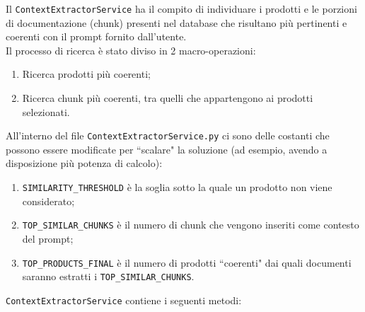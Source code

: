Il \texttt{ContextExtractorService} ha il compito di individuare i prodotti e le porzioni di documentazione (chunk) presenti nel database che risultano più pertinenti e coerenti con il prompt fornito dall'utente.\\ Il processo di ricerca \`e stato diviso in 2 macro-operazioni:
\begin{enumerate}
    \item Ricerca prodotti pi\`u coerenti;
    \item Ricerca chunk pi\`u coerenti, tra quelli che appartengono ai prodotti selezionati.
\end{enumerate}
All'interno del file \texttt{ContextExtractorService.py} ci sono delle costanti che possono essere modificate per ``scalare" la soluzione (ad esempio, avendo a disposizione pi\`u potenza di calcolo):
\begin{enumerate}
    \item \texttt{SIMILARITY\_THRESHOLD} \`e la soglia sotto la quale un prodotto non viene considerato;
    \item \texttt{TOP\_SIMILAR\_CHUNKS} \`e il numero di chunk che vengono inseriti come contesto del prompt;
    \item \texttt{TOP\_PRODUCTS\_FINAL} \`e il numero di prodotti ``coerenti" dai quali documenti saranno estratti i \texttt{TOP\_SIMILAR\_CHUNKS}.
\end{enumerate}
\texttt{ContextExtractorService} contiene i seguenti metodi:
